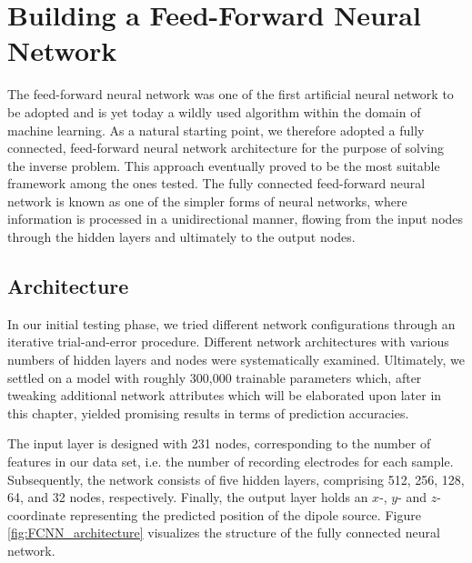 \documentclass[a4paper, UKenglish, 11pt]{uiomaster}
\begin{document}
\section{Building a Feed-Forward Neural Network}
The feed-forward neural network was one of the first artificial neural network to be adopted and is yet today a wildly used algorithm within the domain of machine learning. As a natural starting point, we therefore adopted a fully connected, feed-forward neural network architecture for the purpose of solving the inverse problem. This approach eventually proved to be the most suitable framework among the ones tested. The fully connected feed-forward neural network is known as one of the simpler forms of neural networks, where information is processed in a unidirectional manner, flowing from the input nodes through the hidden layers and ultimately to the output nodes.



\subsection{Architecture}


In our initial testing phase, we tried different network configurations through an
iterative trial-and-error procedure. Different network architectures with various numbers of hidden layers and nodes were systematically examined. Ultimately, we settled on a model with roughly 300,000 trainable parameters which, after tweaking additional network attributes which will be elaborated upon later in this chapter, yielded promising results in terms of prediction accuracies.

The input layer is designed with 231 nodes, corresponding to the number of features in our data set, i.e. the number of recording electrodes for each sample. Subsequently, the network consists of five hidden layers, comprising 512, 256, 128, 64, and 32 nodes, respectively. Finally, the output layer holds an $x$-, $y$- and $z$-coordinate representing the predicted position of the dipole source. Figure \ref{fig:FCNN_architecture} visualizes the structure of the fully connected neural network.
\end{document}
